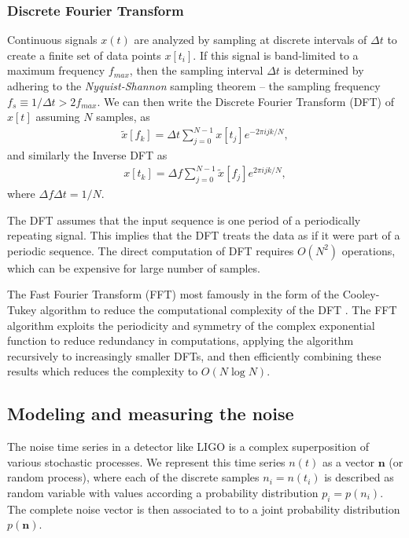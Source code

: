 \subsubsection{Discrete Fourier Transform}
Continuous signals $x(t)$ are analyzed by sampling at discrete intervals of $\Delta t$ to create a finite set of data points $x[t_i]$. If this signal is band-limited to a maximum frequency $f_{max}$, then the sampling interval $\Delta t$ is determined by adhering to the \textit{Nyquist-Shannon} sampling theorem \cite{Nyquist-shannon} -- the sampling frequency $f_s \equiv 1/\Delta t > 2f_{max}$. We can then write the Discrete Fourier Transform (DFT) of $x[t]$ assuming $N$ samples, as
\begin{align}
    \tilde{x}[f_k] = \Delta t \sum_{j=0}^{N-1} x[t_j] e^{-2\pi i j k/N},
\end{align}
and similarly the Inverse DFT as
\begin{align}
    x[t_k] = \Delta f \sum_{j=0}^{N-1} \tilde{x}[f_j] e^{2\pi i j k/N},
\end{align}
where $\Delta f \Delta t = 1/N$.

The DFT assumes that the input sequence is one period of a periodically repeating signal. This implies that the DFT treats the data as if it were part of a periodic sequence. The direct computation of DFT requires $O(N^2)$ operations, which can be expensive for large number of samples. 

The Fast Fourier Transform (FFT) most famously in the form of the Cooley-Tukey algorithm to reduce the computational complexity of the DFT \cite{Cooley-Tukey}.  The FFT algorithm exploits the periodicity and symmetry of the complex exponential function to reduce redundancy in computations, applying the algorithm recursively to increasingly smaller DFTs, and then efficiently combining these results which reduces the complexity to $O(N\log N)$.


\subsection{Modeling and measuring the noise}
The noise time series in a detector like LIGO is a complex superposition of various stochastic processes. We represent this time series $n(t)$ as a vector $\textbf{n}$ (or random process), where each of the discrete samples $n_i = n(t_i)$ is described as random variable with values according a probability distribution $p_i = p(n_i)$. The complete noise vector is then associated to to a joint probability distribution $p(\textbf{n})$. 

